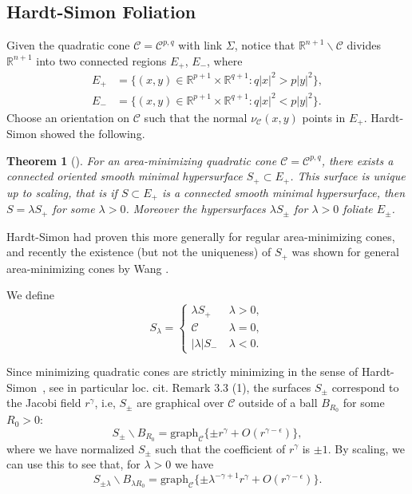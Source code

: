 \documentclass[12pt, reqno ]{amsart}
\newtheorem{theorem}{Theorem}[section]
\numberwithin{equation}{section}
\begin{document}
\subsection{Hardt-Simon Foliation}
Given the quadratic cone $\mathcal{C}= \mathcal{C}^{p,q}$ with link $\Sigma$, notice that $\mathbb{R}^{n+1} \backslash \mathcal{C}$ divides $\mathbb R^{n+1}$ into two connected regions $E_{+}$, $E_-$, where 
\begin{align*}
E_+ &=\{(x, y)\in \mathbb R^{p+1} \times \mathbb R ^{q+1}: q|x|^2>p|y|^2 \},\\
E_- &=\{(x, y)\in \mathbb R^{p+1} \times \mathbb R ^{q+1}: q|x|^2<p|y|^2 \}.
\end{align*}
Choose an orientation on $\mathcal{C}$ such that the normal $\nu_{\mathcal C}(x,y)$ points in $E_+$. Hardt-Simon showed the following.

\begin{theorem}[\cite{SimonHardt}] \label{thm:HardtSimon}
For an area-minimizing quadratic cone $\mathcal C=\mathcal C^{p,q}$, there exists a connected oriented smooth minimal hypersurface $S_+\subset E_+$. This surface is unique up to scaling, that is if $S\subset E_+$ is a connected smooth minimal hypersurface, then $S=\lambda S_+$ for some $\lambda>0$.  Moreover the hypersurfaces $\lambda S_\pm$ for $\lambda > 0$ foliate $E_\pm$.
\end{theorem}
Hardt-Simon had proven this more generally for regular area-minimizing cones, and recently the existence (but not the uniqueness) of $S_+$ was shown for general area-minimizing cones by Wang {\cite{Wang24}}.

We define
$$ S_{\lambda}=\left\{\begin{array}{ccc}
      \lambda S_+ \: &\lambda>0, \\
      \mathcal{C} \: &\lambda=0, \\
      |\lambda| S_- \: &\lambda<0.
 \end{array} \right. $$

Since minimizing quadratic cones are strictly minimizing in the sense of Hardt-Simon~\cite{SimonHardt}, see in particular loc. cit. Remark 3.3 (1), the surfaces $S_{\pm}$ correspond to the Jacobi field $r^{\gamma}$, i.e, $S_{\pm}$ are graphical over $\mathcal C$ outside of a ball $B_{R_0}$ for some $R_0>0$:
$$ S_{\pm} \backslash B_{R_0}=\mbox{graph}_{\mathcal{C}}\{ \pm r^\gamma+O(r^{\gamma -\epsilon})\},$$
where we have normalized $S_{\pm}$ such that the coefficient of $r^\gamma$ is $\pm 1$. By scaling, we can use this to see that, for $\lambda>0$ we have
\begin{equation}\label{graphS_lambda}
S_{\pm \lambda}\backslash B_{\lambda R_0}=\mbox{graph}_{\mathcal{C}}\{ \pm \lambda^{-\gamma +1}  r^{\gamma}+O(r^{\gamma -\epsilon})\}.
\end{equation}
\end{document}
